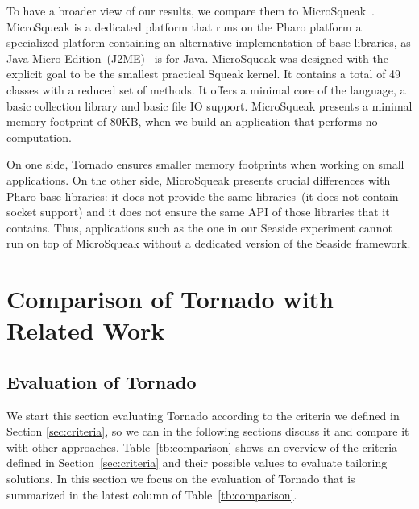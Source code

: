 To have a broader view of our results, we compare them to MicroSqueak~\cite{Malo11a}. MicroSqueak is a dedicated platform that runs on the Pharo platform \ie a specialized platform containing an alternative implementation of base libraries, as Java Micro Edition~(J2ME)~\cite{JavaME} is for Java. MicroSqueak was designed with the explicit goal to be the smallest practical Squeak kernel. It contains a total of 49 classes with a reduced set of methods. It offers a minimal core of the language, a basic collection library and basic file IO support. MicroSqueak presents a minimal memory footprint of 80KB, when we build an application that performs no computation.

On one side, Tornado ensures smaller memory footprints when working on small applications. On the other side, MicroSqueak presents crucial differences with Pharo base libraries: it does not provide the same libraries~(\eg it does not contain socket support) and it does not ensure the same API of those libraries that it contains. Thus, applications such as the one in our Seaside experiment cannot run on top of MicroSqueak without a dedicated version of the Seaside framework.

\section{Comparison of Tornado with Related Work} \label{sec:related_work}



\subsection{Evaluation of Tornado}

We start this section evaluating Tornado according to the criteria we defined in Section \ref{sec:criteria}, so we can in the following sections discuss it and compare it with other approaches. Table~\ref{tb:comparison} shows an overview of the criteria defined in Section~\ref{sec:criteria} and their possible values to evaluate tailoring solutions.
In this section we focus on the evaluation of Tornado that is summarized in the latest column of Table~\ref{tb:comparison}.

